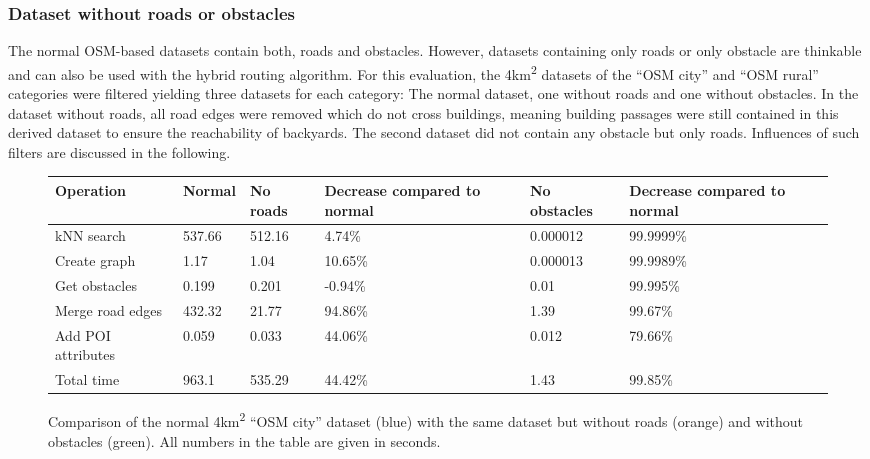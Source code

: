 			
		\subsubsection{Dataset without roads or obstacles}
		
			The normal OSM-based datasets contain both, roads and obstacles.
			However, datasets containing only roads or only obstacle are thinkable and can also be used with the hybrid routing algorithm.
			For this evaluation, the 4km\textsuperscript{2} datasets of the \enquote{OSM city} and \enquote{OSM rural} categories were filtered yielding three datasets for each category:
			The normal dataset, one without roads and one without obstacles.
			In the dataset without roads, all road edges were removed which do not cross buildings, meaning building passages were still contained in this derived dataset to ensure the reachability of backyards.
			The second dataset did not contain any obstacle but only roads.
			Influences of such filters are discussed in the following.
			
			\begin{figure}[h!]
				\begin{figcenter}
					\begin{tabularx}{0.95\textwidth}{p{3cm}|X|XX|p{2.25cm}X}
\textbf{Operation} & \textbf{Normal} & \textbf{No roads} & \textbf{Decrease compared to normal} & \textbf{No obstacles} & \textbf{Decrease compared to normal} \\
\hline
kNN search			& 537.66	& 512.16	& 4.74\%						& 0.000012		& 99.9999\%						\\
Create graph		& 1.17		& 1.04		& 10.65\%						& 0.000013		& 99.9989\%						\\
Get obstacles		& 0.199		& 0.201		& -0.94\%						& 0.01			& 99.995\%						\\
Merge road edges	& 432.32	& 21.77		& 94.86\%						& 1.39			& 99.67\%						\\
Add POI attributes	& 0.059		& 0.033		& 44.06\%						& 0.012			& 79.66\%						\\
\hline
Total time			& 963.1		& 535.29	& 44.42\%						& 1.43			& 99.85\%
					\end{tabularx}
				\end{figcenter}
				\vspace{3ex}
				\begin{figcenter}
					
				\end{figcenter}
				\caption{Comparison of the normal 4km\textsuperscript{2} \enquote{OSM city} dataset (blue) with the same dataset but without roads (orange) and without obstacles (green). All numbers in the table are given in seconds.}
				\label{fig:eval-import-osm-no-roads-obstacles-city}
			\end{figure}
			
